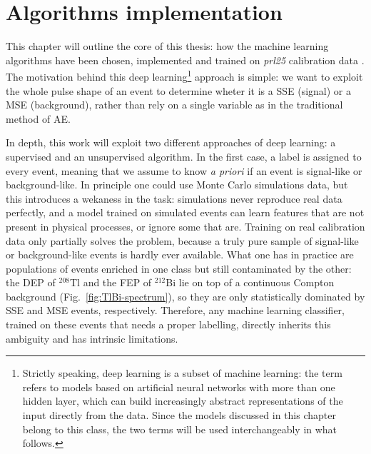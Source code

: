 \chapter{Algorithms implementation}
\label{chapter:ML-PSD}
This chapter will outline the core of this thesis: how the machine learning algorithms have been chosen, implemented and trained on \textit{prl25} calibration data \cite{L200-sep25}. The motivation behind this deep learning\footnote{Strictly speaking, deep learning is a subset of machine learning: the term refers to models based on artificial neural networks with more than one hidden layer, which can build increasingly abstract representations of the input directly from the data. Since the models discussed in this chapter belong to this class, the two terms will be used interchangeably in what follows.} approach is simple: we want to exploit the whole pulse shape of an event to determine wheter it is a \ac{SSE} (signal) or a \ac{MSE} (background), rather than rely on a single variable as in the traditional method of \ac{AE}.

In depth, this work will exploit two different approaches of deep learning: a supervised and an unsupervised algorithm. In the first case, a label is assigned to every event, meaning that we assume to know \textit{a priori} if an event is signal-like or background-like. In principle one could use Monte Carlo simulations data, but this introduces a wekaness in the task: simulations never reproduce real data perfectly, and a model trained on simulated events can learn features that are not present in physical processes, or ignore some that are. Training on real calibration data only partially solves the problem, because a truly pure sample of signal-like or background-like events is hardly ever available. What one has in practice are populations of events enriched in one class but still contaminated by the other: the \ac{DEP} of ${}^{208}$Tl and the \ac{FEP} of ${}^{212}$Bi lie on top of a continuous Compton background (Fig.~\ref{fig:TlBi-spectrum}), so they are only statistically dominated by \ac{SSE} and \ac{MSE} events, respectively. Therefore, any machine learning classifier, trained on these events that needs a proper labelling, directly inherits this ambiguity and has intrinsic limitations. 

